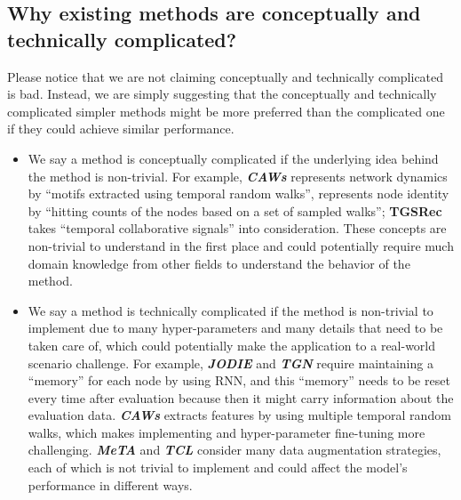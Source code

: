\subsection{Why existing methods are conceptually and technically complicated?}

Please notice that we are not claiming conceptually and technically complicated is bad. Instead, we are simply suggesting that the conceptually and technically complicated simpler methods might be more preferred than the complicated one if they could achieve similar performance.

\begin{itemize} [noitemsep,topsep=0pt,leftmargin=2mm ]
    \item We say a method is conceptually complicated if the underlying idea behind the method is non-trivial. 
For example, \textit{\textbf{CAWs}} represents network dynamics by ``motifs extracted using temporal random walks'', represents node identity by ``hitting counts of the nodes based on a set of sampled walks''; \textbf{TGSRec} takes ``temporal collaborative signals'' into consideration. These concepts are non-trivial to understand in the first place and could potentially require much domain knowledge from other fields to understand the behavior of the method.
    \item We say a method is technically complicated if the method is non-trivial to implement due to many hyper-parameters and many details that need to be taken care of, which could potentially make the application to a real-world scenario challenge.
For example, \textit{\textbf{JODIE}} and \textit{\textbf{TGN}} require maintaining a ``memory'' for each node by using RNN, and this ``memory'' needs to be reset every time after evaluation because then it might carry information about the evaluation data. \textit{\textbf{CAWs}} extracts features by using multiple temporal random walks, which makes implementing and hyper-parameter fine-tuning more challenging. \textit{\textbf{MeTA}} and \textit{\textbf{TCL}} consider many data augmentation strategies, each of which is not trivial to implement and could affect the model's performance in different ways.

\end{itemize}


